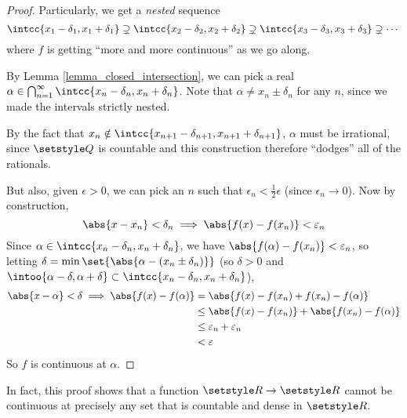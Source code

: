 \documentclass[fleqn,a4paper,11pt]{article}
\begin{document}
\begin{proof}
  Particularly, we get a \emph{nested} sequence
  \begin{equation*}
   \intcc{x_1 - \delta_1, x_1 + \delta_1} \supsetneq
   \intcc{x_2 - \delta_2, x_2 + \delta_2} \supsetneq
   \intcc{x_3 - \delta_3, x_3 + \delta_3} \supsetneq \dotsb
  \end{equation*}
  where \(f\) is getting ``more and more continuous'' as we go along.

  By Lemma \ref{lemma_closed_intersection}, we can pick a real
  \(\alpha \in \bigcap_{n = 1}^\infty \intcc{x_n - \delta_n, x_n + \delta_n}\).
  Note that \(\alpha \ne x_n \pm \delta_n\) for any \(n\), since we made the
  intervals strictly nested.

  By the fact that
  \(x_n \notin \intcc{x_{n + 1} - \delta_{n + 1}, x_{n + 1} + \delta_{n + 1}}\),
  \(\alpha\) must be irrational, since \(\Q\) is countable and this construction
  therefore ``dodges'' all of the rationals.

  But also, given \(\epsilon > 0\), we can pick an \(n\) such that
  \(\epsilon_n < \frac 12 \epsilon\) (since \(\epsilon_n \to 0\)). Now by
  construction,
  \begin{equation*}
   \abs{x - x_n} < \delta_n \implies \abs{f(x) - f(x_n)} < \epsilon_n
  \end{equation*}
  Since \(\alpha \in \intcc{x_n - \delta_n, x_n + \delta_n}\), we have
  \(\abs{f(\alpha) - f(x_n)} < \epsilon_n\), so letting
  \(\delta = \min\set{\abs{\alpha - (x_n \pm \delta_n)}}\)
  (so \(\delta > 0\) and \(\intoo{\alpha - \delta, \alpha + \delta} \subset
                           \intcc{x_n - \delta_n, x_n + \delta_n}\)),
  \begin{align*}
   \abs{x - \alpha } < \delta \implies
   \abs{f(x) - f(\alpha)}
   &= \abs{f(x) - f(x_n) + f(x_n) - f(\alpha)} \\
   &\le \abs{f(x) - f(x_n)} + \abs{f(x_n) - f(\alpha)} \\
   &\le \epsilon_n + \epsilon_n \\
   &< \epsilon
  \end{align*}
  So \(f\) is continuous at \(\alpha\).
 \end{proof}
 In fact, this proof shows that a function \(\R \to \R\) cannot be continuous at
 precisely any set that is countable and dense in \(\R\).
\end{document}
